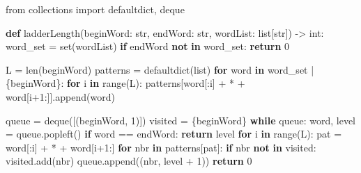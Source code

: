 \documentclass[11pt]{article}
\newenvironment{Shaded}{\begin{snugshade}}{\end{snugshade}}
\newcommand{\BuiltInTok}[1]{\textcolor[rgb]{0.50,0.55,0.55}{#1}}
\newcommand{\ControlFlowTok}[1]{\textcolor[rgb]{0.99,0.74,0.29}{\textbf{#1}}}
\newcommand{\DecValTok}[1]{\textcolor[rgb]{0.96,0.45,0.00}{#1}}
\newcommand{\ImportTok}[1]{\textcolor[rgb]{0.15,0.68,0.38}{#1}}
\newcommand{\KeywordTok}[1]{\textcolor[rgb]{0.81,0.81,0.76}{\textbf{#1}}}
\newcommand{\NormalTok}[1]{\textcolor[rgb]{0.81,0.81,0.76}{#1}}
\newcommand{\OperatorTok}[1]{\textcolor[rgb]{0.81,0.81,0.76}{#1}}
\newcommand{\StringTok}[1]{\textcolor[rgb]{0.96,0.31,0.31}{#1}}
\begin{document}
\begin{Shaded}
\begin{Highlighting}[]
\ImportTok{from}\NormalTok{ collections }\ImportTok{import}\NormalTok{ defaultdict, deque}

\KeywordTok{def}\NormalTok{ ladderLength(beginWord: }\BuiltInTok{str}\NormalTok{, endWord: }\BuiltInTok{str}\NormalTok{, wordList: }\BuiltInTok{list}\NormalTok{[}\BuiltInTok{str}\NormalTok{]) }\OperatorTok{{-}\textgreater{}} \BuiltInTok{int}\NormalTok{:}
\NormalTok{    word\_set }\OperatorTok{=} \BuiltInTok{set}\NormalTok{(wordList)}
    \ControlFlowTok{if}\NormalTok{ endWord }\KeywordTok{not} \KeywordTok{in}\NormalTok{ word\_set:}
        \ControlFlowTok{return} \DecValTok{0}

\NormalTok{    L }\OperatorTok{=} \BuiltInTok{len}\NormalTok{(beginWord)}
\NormalTok{    patterns }\OperatorTok{=}\NormalTok{ defaultdict(}\BuiltInTok{list}\NormalTok{)}
    \ControlFlowTok{for}\NormalTok{ word }\KeywordTok{in}\NormalTok{ word\_set }\OperatorTok{|}\NormalTok{ \{beginWord\}:}
        \ControlFlowTok{for}\NormalTok{ i }\KeywordTok{in} \BuiltInTok{range}\NormalTok{(L):}
\NormalTok{            patterns[word[:i] }\OperatorTok{+} \StringTok{\textquotesingle{}*\textquotesingle{}} \OperatorTok{+}\NormalTok{ word[i}\OperatorTok{+}\DecValTok{1}\NormalTok{:]].append(word)}

\NormalTok{    queue }\OperatorTok{=}\NormalTok{ deque([(beginWord, }\DecValTok{1}\NormalTok{)])}
\NormalTok{    visited }\OperatorTok{=}\NormalTok{ \{beginWord\}}
    \ControlFlowTok{while}\NormalTok{ queue:}
\NormalTok{        word, level }\OperatorTok{=}\NormalTok{ queue.popleft()}
        \ControlFlowTok{if}\NormalTok{ word }\OperatorTok{==}\NormalTok{ endWord:}
            \ControlFlowTok{return}\NormalTok{ level}
        \ControlFlowTok{for}\NormalTok{ i }\KeywordTok{in} \BuiltInTok{range}\NormalTok{(L):}
\NormalTok{            pat }\OperatorTok{=}\NormalTok{ word[:i] }\OperatorTok{+} \StringTok{\textquotesingle{}*\textquotesingle{}} \OperatorTok{+}\NormalTok{ word[i}\OperatorTok{+}\DecValTok{1}\NormalTok{:]}
            \ControlFlowTok{for}\NormalTok{ nbr }\KeywordTok{in}\NormalTok{ patterns[pat]:}
                \ControlFlowTok{if}\NormalTok{ nbr }\KeywordTok{not} \KeywordTok{in}\NormalTok{ visited:}
\NormalTok{                    visited.add(nbr)}
\NormalTok{                    queue.append((nbr, level }\OperatorTok{+} \DecValTok{1}\NormalTok{))}
    \ControlFlowTok{return} \DecValTok{0}
\end{Highlighting}
\end{Shaded}
\end{document}
